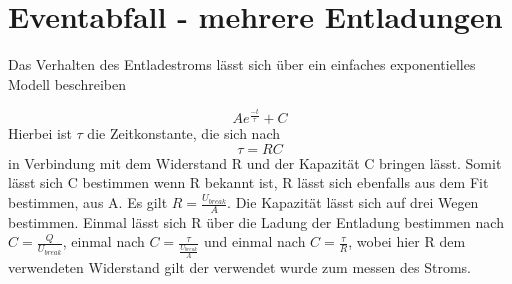 \section{Eventabfall - mehrere Entladungen}
Das Verhalten des Entladestroms lässt sich über ein einfaches exponentielles Modell beschreiben

\begin{equation}
    Ae^{\frac{-t}{\tau}} + C
    \label{eq:discharge-e}
\end{equation}
Hierbei ist \(\tau\) die Zeitkonstante, die sich nach
\begin{equation}
    \tau = RC
\end{equation} 
in Verbindung mit dem Widerstand R und der Kapazität C bringen lässt. Somit lässt sich C bestimmen wenn R bekannt ist, R lässt sich ebenfalls aus dem Fit bestimmen, aus A. Es gilt \(R = \frac{U_{break}}{A}\). Die Kapazität lässt sich auf drei Wegen bestimmen. Einmal lässt sich R über die Ladung der Entladung bestimmen nach \(C = \frac{Q}{U_{break}}\), einmal nach \(C = \frac{\tau}{\frac{U_{break}}{A}}\) und einmal nach \(C = \frac{\tau}{R}\), wobei hier R dem verwendeten Widerstand gilt der verwendet wurde zum messen des Stroms. 
